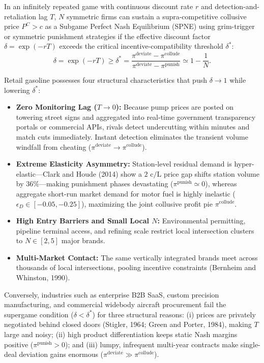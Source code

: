 \documentclass[11pt]{article}
\begin{document}
In an infinitely repeated game with continuous discount rate $r$ and detection-and-retaliation lag $T$, $N$ symmetric firms can sustain a supra-competitive collusive price $P^C > c$ as a Subgame Perfect Nash Equilibrium (SPNE) using grim-trigger or symmetric punishment strategies if the effective discount factor $\delta = \exp(-rT)$ exceeds the critical incentive-compatibility threshold $\delta^*$:
\begin{equation}
\delta = \exp(-rT) \ge \delta^* = \frac{\pi^{\text{deviate}} - \pi^{\text{collude}}}{\pi^{\text{deviate}} - \pi^{\text{punish}}} \simeq 1 - \frac{1}{N}.
\label{eq:spne-threshold}
\end{equation}

Retail gasoline possesses four structural characteristics that push $\delta \to 1$ while lowering $\delta^*$:
\begin{itemize}
\item \textbf{Zero Monitoring Lag ($T \to 0$):} Because pump prices are posted on towering street signs and aggregated into real-time government transparency portals or commercial APIs, rivals detect undercutting within minutes and match cuts immediately. Instant detection eliminates the transient volume windfall from cheating ($\pi^{\text{deviate}} \to \pi^{\text{collude}}$).
\item \textbf{Extreme Elasticity Asymmetry:} Station-level residual demand is hyper-elastic---Clark and Houde (2014) show a $2\text{ c/L}$ price gap shifts station volume by $36\%$---making punishment phases devastating ($\pi^{\text{punish}} \simeq 0$), whereas aggregate short-run market demand for motor fuel is highly inelastic ($\epsilon_D \in [-0.05, -0.25]$), maximizing the joint collusive profit pie $\pi^{\text{collude}}$.
\item \textbf{High Entry Barriers and Small Local $N$:} Environmental permitting, pipeline terminal access, and refining scale restrict local intersection clusters to $N \in [2, 5]$ major brands.
\item \textbf{Multi-Market Contact:} The same vertically integrated brands meet across thousands of local intersections, pooling incentive constraints (Bernheim and Whinston, 1990).
\end{itemize}

Conversely, industries such as enterprise B2B SaaS, custom precision manufacturing, and commercial widebody aircraft procurement fail the supergame condition ($\delta < \delta^*$) for three structural reasons: (i) prices are privately negotiated behind closed doors (Stigler, 1964; Green and Porter, 1984), making $T$ large and noisy; (ii) high product differentiation keeps static Nash margins positive ($\pi^{\text{punish}} > 0$); and (iii) lumpy, infrequent multi-year contracts make single-deal deviation gains enormous ($\pi^{\text{deviate}} \gg \pi^{\text{collude}}$).
\end{document}
